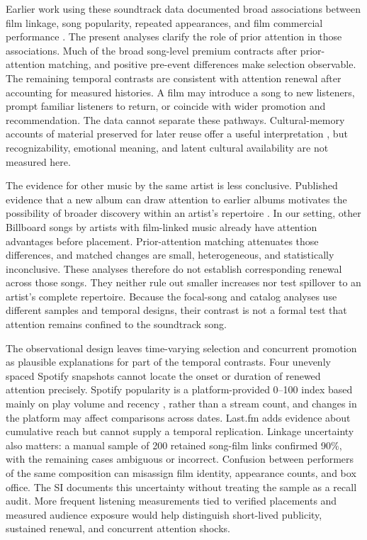 \documentclass[10pt]{article}
\begin{document}
Earlier work using these soundtrack data documented broad associations between film linkage, song popularity, repeated appearances, and film commercial performance \citep{utreras2024}. The present analyses clarify the role of prior attention in those associations. Much of the broad song-level premium contracts after prior-attention matching, and positive pre-event differences make selection observable. The remaining temporal contrasts are consistent with attention renewal after accounting for measured histories. A film may introduce a song to new listeners, prompt familiar listeners to return, or coincide with wider promotion and recommendation. The data cannot separate these pathways. Cultural-memory accounts of material preserved for later reuse offer a useful interpretation \citep{Assmann1995,Assmann2008,Assmann2011}, but recognizability, emotional meaning, and latent cultural availability are not measured here.

The evidence for other music by the same artist is less conclusive. Published evidence that a new album can draw attention to earlier albums motivates the possibility of broader discovery within an artist's repertoire \citep{HendricksSorensen2009}. In our setting, other Billboard songs by artists with film-linked music already have attention advantages before placement. Prior-attention matching attenuates those differences, and matched changes are small, heterogeneous, and statistically inconclusive. These analyses therefore do not establish corresponding renewal across those songs. They neither rule out smaller increases nor test spillover to an artist's complete repertoire. Because the focal-song and catalog analyses use different samples and temporal designs, their contrast is not a formal test that attention remains confined to the soundtrack song.

The observational design leaves time-varying selection and concurrent promotion as plausible explanations for part of the temporal contrasts. Four unevenly spaced Spotify snapshots cannot locate the onset or duration of renewed attention precisely. Spotify popularity is a platform-provided 0--100 index based mainly on play volume and recency \citep{SpotifyPopularity}, rather than a stream count, and changes in the platform may affect comparisons across dates. Last.fm adds evidence about cumulative reach but cannot supply a temporal replication. Linkage uncertainty also matters: a manual sample of 200 retained song-film links confirmed 90\%, with the remaining cases ambiguous or incorrect. Confusion between performers of the same composition can misassign film identity, appearance counts, and box office. The SI documents this uncertainty without treating the sample as a recall audit. More frequent listening measurements tied to verified placements and measured audience exposure would help distinguish short-lived publicity, sustained renewal, and concurrent attention shocks.
\end{document}
